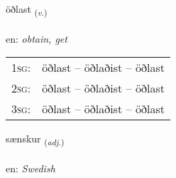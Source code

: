\documentclass[frontgrid, backgrid]{flacards}\usepackage[]{graphicx}\usepackage[]{color}
\begin{document}
\renewcommand{\flhead}{\vskip5pt \fboxsep=0pt {\small\bfseries\footnotesize Sagnorð | Verb}}
\renewcommand{\fcfoot}{\vskip5pt \fboxsep=0pt \hspace{2pt}{\small\bfseries\footnotesize 2K}}

\renewcommand{\blhead}{\vskip5pt {\small\bfseries\footnotesize Sagnorð | Verb }}
\renewcommand{\bcfoot}{\vskip5pt \hspace{2pt}{\small\bfseries\footnotesize 2K}}


{öðlast \small{\textsubscript{(\textit{v.})}} \\[1ex] %
\textphonetic{[œðlast]} \\
en: \emph{obtain, get} \\  [2ex]
\renewcommand*{\arraystretch}{0.8}
\begin{tabular}{p{1cm}l}
\textsc{1sg}: & öðlast -- öðlaðist -- öðlast \\ 
\textsc{2sg}: & öðlast -- öðlaðist -- öðlast \\ 
\textsc{3sg}: & öðlast -- öðlaðist -- öðlast \\ 
\end{tabular}
}

\renewcommand{\flhead}{\vskip5pt \fboxsep=0pt {\small\bfseries\footnotesize Lýsingarorð | Adjective}}
\renewcommand{\fcfoot}{\vskip5pt \fboxsep=0pt \hspace{2pt}{\small\bfseries\footnotesize 2K}}

\renewcommand{\blhead}{\vskip5pt {\small\bfseries\footnotesize Lýsingarorð | Adjective }}
\renewcommand{\bcfoot}{\vskip5pt \hspace{2pt}{\small\bfseries\footnotesize 2K}}


{sænskur \small{\textsubscript{(\textit{adj.})}} \\[1ex] %
\textphonetic{[sainskʏr]} \\
en: \emph{Swedish} \\  [2ex]
\renewcommand*{\arraystretch}{0.8}
}
\end{document}

